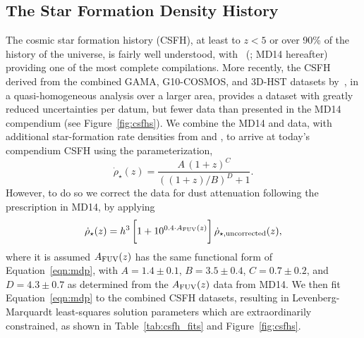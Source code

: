 \documentclass[apj]{aastex62}
\begin{document}
\subsection{The Star Formation Density History}
The cosmic star formation history (CSFH), at least to $z < 5$ or over 90\% of the history of the universe, is fairly well understood, with~\citeauthor{Madau:2014fk} (\citeyear{Madau:2014fk}; MD14 hereafter) providing one of the most complete compilations. More recently, the CSFH derived from the combined GAMA, G10-COSMOS, and 3D-HST datasets by~\cite{Driver:2018nr}, in a quasi-homogeneous analysis over a larger area, provides a dataset with greatly reduced uncertainties per datum, but fewer data than presented in the MD14 compendium (see Figure~\ref{fig:csfhs}).  We combine the MD14 and \cite{Driver:2018nr} data, with additional star-formation rate densities from \cite{Bouwens:2015qy} and \cite{Khusanova:2019kx}, to arrive at today's compendium CSFH using the parameterization,
\begin{equation}
\dot{\rho}_{\star}(z) = \frac{A\,(1+z)^C}{((1+z)/B)^D+1}.\label{eqn:mdp}
\end{equation}
However, to do so we correct the \cite{Driver:2018nr} data for dust attenuation following the prescription in MD14, by applying 
\begin{equation}
	\dot{\rho}_{\star}(z) =h^3\,\biggl[1+10^{0.4\cdot A_{\rm FUV}(z)}\biggr]\, \dot{\rho}_{\star, {\rm uncorrected}}(z),
\end{equation}
\noindent where it is assumed $A_{\rm FUV}(z)$ has the same functional form of Equation~\ref{eqn:mdp}, with $A=1.4\pm0.1$, $B=3.5\pm0.4$, $C=0.7\pm0.2$, and $D=4.3\pm0.7$ as determined from the $A_{\rm FUV}(z)$ data from MD14. We then fit Equation~\ref{eqn:mdp} to the combined CSFH datasets, resulting in Levenberg-Marquardt least-squares solution parameters which are extraordinarily constrained, as shown in Table~\ref{tab:csfh_fits} and Figure~\ref{fig:csfhs}. 
\end{document}
